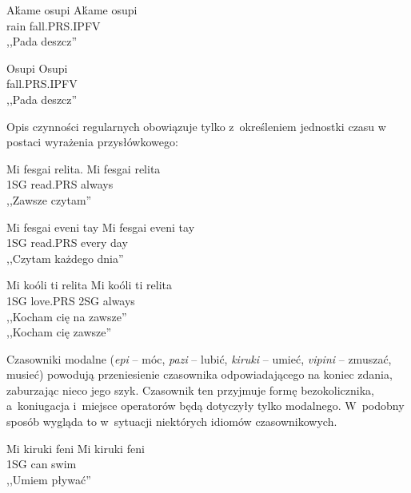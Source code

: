 \begin{spacing}{1.1}

\begin{exe}
	\ex
	\trans Aḱame osupi
	\gll  Aḱame osupi \\
	  rain fall.PRS.IPFV \\
	\glt  ,,Pada deszcz''
\end{exe}

\begin{exe}
	\ex
	\trans Osupi
	\gll  Osupi \\
	  fall.PRS.IPFV \\
	\glt  ,,Pada deszcz''
\end{exe}

Opis czynności regularnych obowiązuje tylko z~określeniem jednostki czasu w
postaci wyrażenia przysłówkowego:

\begin{exe}
	\ex
	\trans Mi fesgai relita.
	\gll  Mi fesgai relita \\
	  1SG read.PRS always \\
	\glt  ,,Zawsze czytam''
\end{exe}

\begin{exe}
	\ex
	\trans Mi fesgai eveni tay
	\gll  Mi fesgai eveni tay\\
	  1SG read.PRS every day \\
	\glt  ,,Czytam każdego dnia''
\end{exe}

\begin{exe}
	\ex
	\trans Mi koóli ti relita
	\gll  Mi koóli ti relita\\
	  1SG love.PRS 2SG always \\
	\glt  ,,Kocham cię na zawsze'' \\ ,,Kocham cię zawsze''
\end{exe}

Czasowniki modalne (\emph{epi} -- móc, \emph{pazi} -- lubić, \emph{kiruki} --
umieć, \emph{vipini} -- zmuszać, musieć) powodują przeniesienie czasownika
odpowiadającego na koniec zdania, zaburzając nieco jego szyk. Czasownik ten
przyjmuje formę bezokolicznika, a~koniugacja i~miejsce operatorów będą dotyczyły
tylko modalnego. W~podobny sposób wygląda to w~sytuacji niektórych idiomów
czasownikowych.

\begin{exe}
	\ex
	\trans Mi kiruki feni
	\gll  Mi kiruki feni\\
	  1SG can swim \\
	\glt  ,,Umiem pływać''
\end{exe}


\end{spacing}
